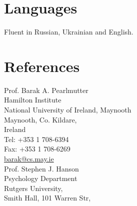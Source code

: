\documentclass[12pt,overlapped,line]{res}
\begin{document}
\begin{resume}
\section{Languages}
 Fluent in Russian, Ukrainian and English.

 \section{References}

 \vspace{0em}
  \begin{multicols}{2}
 {\small
    Prof. Barak A. Pearlmutter \\
    Hamilton Institute \\
    National University of Ireland, Maynooth \\
    Maynooth, Co. Kildare, \\
    Ireland \\
    Tel: +353 1 708-6394\\
    Fax: +353 1 708-6269\\
    \url{barak@cs.may.ie} \\
    Prof. Stephen J. Hanson \\
    Psychology Department \\
    Rutgers University, \\
    Smith Hall, 101 Warren Str, \\
}
\end{multicols}
\end{resume}
\end{document}
